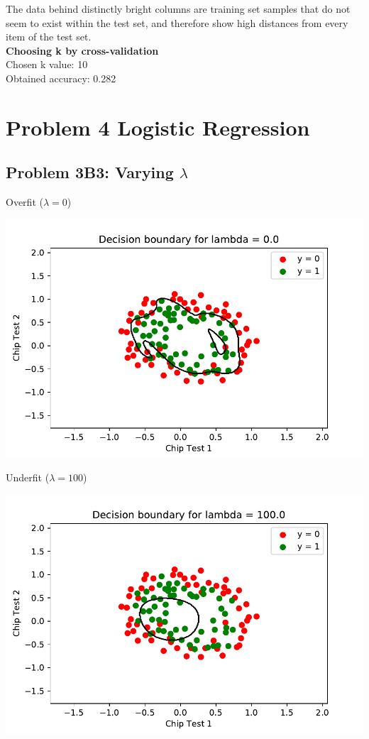 \documentclass[12pt]{article}
\begin{document}
The data behind distinctly bright columns are training set samples that do not seem to exist within the test set, and therefore show high distances from every item of the test set.\\

\textbf{Choosing k by cross-validation}\\
Chosen k value: 10\\
Obtained accuracy: 0.282\\



\section*{Problem 4 Logistic Regression}
\subsection*{Problem 3B3: Varying $\lambda$}

Overfit ($\lambda = 0$)
\begin{center}
	\includegraphics[scale=0.5]{fig4_overfit}
\end{center}
Underfit ($\lambda = 100$)
\begin{center}
	\includegraphics[scale=0.5]{fig4_underfit}
\end{center}
\end{document}

